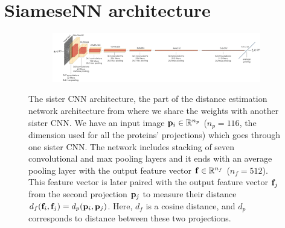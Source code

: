 \section{SiameseNN architecture}\label{apx:siamese-architecture}

\begin{figure}[ht!]
    \centering
    \begin{subfigure}[t]{1.0\linewidth}
        \includegraphics[width=\linewidth]{figures/architecture2.pdf}
    \end{subfigure}
    \caption{%
        The sister CNN architecture, the part of the distance estimation network architecture from  where we share the weights with another sister CNN.
        We have an input image $\mathbf{p}_i \in \mathbb{R}^{n_p}$ ($n_p=116$, the dimension used for all the proteins' projections) which goes through one sister CNN.
        The network includes stacking of seven convolutional and max pooling layers and it ends with an average pooling layer with the output feature vector $\mathbf{f} \in \mathbb{R}^{n_f}$ ($n_f=512$).
        This feature vector is later paired with the output feature vector $\mathbf{f}_j$ from the second projection $\mathbf{p}_j$ to measure their distance $d_f(\mathbf{f}_i, \mathbf{f}_j)=d_p(\mathbf{p}_i,\mathbf{p}_j)$. Here, $d_f$ is a cosine distance, and $d_p$ corresponds to distance between these two projections.
}
\end{figure}
